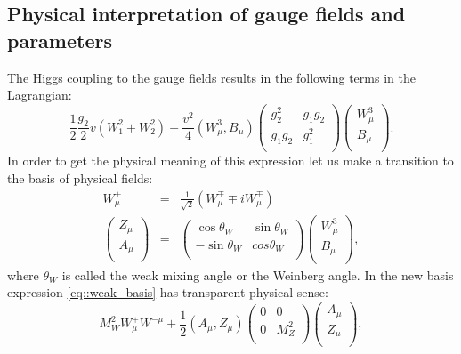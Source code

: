 \subsection{Physical interpretation of gauge fields and parameters}
The Higgs coupling to the gauge fields results in the following terms in the Lagrangian:
\begin{equation}
\label{eq::weak_basis}
\frac{1}{2}\frac{g_2}{2}v(W_1^2+W^2_2)+\frac{v^2}{4}(W^3_{\mu},B_{\mu}) \begin{pmatrix}
g_2^2  & g_1 g_2 \\
g_1 g_2 & g_1^2   \\
\end{pmatrix}
\begin{pmatrix}
W^3_{\mu} \\
B_{\mu}   \\
\end{pmatrix}.
\end{equation}
In order to get the physical meaning of this expression let us make a transition to the basis of physical fields:
\begin{equation}
\begin{array}{lcl} 
W^{\pm}_{\mu}  &=& \frac{1}{\sqrt{2}}(W^{\mp}_{\mu}\mp iW^{\mp}_{\mu})\\ 
\begin{pmatrix} Z_{\mu} \\ A_{\mu}   \\ \end{pmatrix}  &=& \begin{pmatrix} \cos{\theta_{W}} & \sin{\theta_{W}}\\ -\sin{\theta_{W}}& cos{\theta_{W}}   \\ \end{pmatrix} \begin{pmatrix} W^3_{\mu} \\ B_{\mu}   \\ \end{pmatrix},
\end{array} 
\end{equation}
where $\theta_{W}$ is called the weak mixing angle or the Weinberg angle. In the new basis expression \ref{eq::weak_basis} has transparent physical sense:
\begin{equation}
M^2_W W^+_{\mu}W^{-\mu} +\frac{1}{2} (A_{\mu},Z_{\mu})\begin{pmatrix}
0 & 0 \\
0 & M^2_Z   \\
\end{pmatrix}
\begin{pmatrix}
A_{\mu} \\
Z_{\mu}   \\
\end{pmatrix},
\end{equation}
